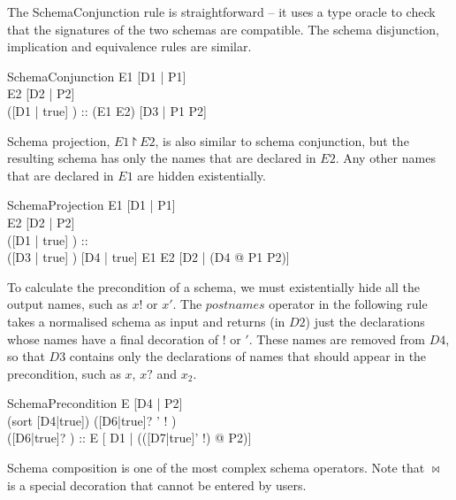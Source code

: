 \documentclass{entcs}
\newcommand{\sexprUnfoldsTo}{\mathrel{=_{se}}}
\newcommand{\is}{\mathrel{is}}
\begin{document}
The SchemaConjunction rule is straightforward -- it uses a type
oracle to check that the signatures of the two schemas are compatible.
The schema disjunction, implication and equivalence rules are similar.

\begin{zedrule}{SchemaConjunction}
  E1 \sexprUnfoldsTo [D1 | P1] \\
  E2 \sexprUnfoldsTo [D2 | P2] \\
  ([D1 | true] \land [D2 | true]) :: \power [D3 | true]
\derives
  (E1 \land E2) \sexprUnfoldsTo [D3 | P1 \land P2]
\end{zedrule}

Schema projection, $E1 \project E2$, is also similar to schema conjunction,
but the resulting schema has only the names that are declared in $E2$.
Any other names that are declared in $E1$ are hidden existentially.

\begin{zedrule}{SchemaProjection}
  E1 \sexprUnfoldsTo [D1 | P1] \\
  E2 \sexprUnfoldsTo [D2 | P2] \\
  ([D1 | true] \land [D2 | true]) :: \power [D3 | true] \\
  ([D3 | true] \schemaminus [D2 | true]) \is [D4 | true]
\derives
  E1 \project E2 \sexprUnfoldsTo [D2 | (\exists D4 @ P1 \land P2)]
\end{zedrule}

To calculate the precondition of a schema, we must existentially
hide all the output names, such as $x!$ or $x'$.  The $postnames$ 
operator in the following rule takes a normalised schema as input and
returns (in $D2$) just the declarations whose names have a final decoration 
of $!$ or $'$.  These names are removed from $D4$, so that $D3$ contains 
only the declarations of names that should appear in the precondition, 
such as $x$, $x?$ and $x_2$.

\begin{zedrule}{SchemaPrecondition}
  E \sexprUnfoldsTo [D4 | P2] \\
  (sort [D4|true]) \is ([D6|true]? \land [D7|true]' \land
                        [D8|true]! \land [D9|true]) \\
  ([D6|true]? \land [D9|true]) :: \power [D1|true]
\derives
  \pre E \sexprUnfoldsTo [ D1 | (\exists ([D7|true]' \land [D8|true]!) @ P2)]
\end{zedrule}

Schema composition is one of the most complex schema operators.
Note that $\bowtie$ is a special decoration that cannot be entered by
users.
\end{document}
